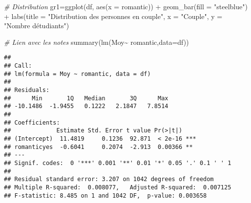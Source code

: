 \documentclass[
]{article}
\newenvironment{Shaded}{\begin{snugshade}}{\end{snugshade}}
\newcommand{\AttributeTok}[1]{\textcolor[rgb]{0.77,0.63,0.00}{#1}}
\newcommand{\CommentTok}[1]{\textcolor[rgb]{0.56,0.35,0.01}{\textit{#1}}}
\newcommand{\FunctionTok}[1]{\textcolor[rgb]{0.00,0.00,0.00}{#1}}
\newcommand{\NormalTok}[1]{#1}
\newcommand{\OtherTok}[1]{\textcolor[rgb]{0.56,0.35,0.01}{#1}}
\newcommand{\SpecialCharTok}[1]{\textcolor[rgb]{0.00,0.00,0.00}{#1}}
\newcommand{\StringTok}[1]{\textcolor[rgb]{0.31,0.60,0.02}{#1}}
\begin{document}
\begin{Shaded}
\begin{Highlighting}[]
\CommentTok{\# Distribution}
\NormalTok{gr1}\OtherTok{=}\FunctionTok{ggplot}\NormalTok{(df, }\FunctionTok{aes}\NormalTok{(}\AttributeTok{x =}\NormalTok{ romantic)) }\SpecialCharTok{+}
  \FunctionTok{geom\_bar}\NormalTok{(}\AttributeTok{fill =} \StringTok{"steelblue"}\NormalTok{) }\SpecialCharTok{+}
  \FunctionTok{labs}\NormalTok{(}\AttributeTok{title =} \StringTok{"Distribution des personnes en couple"}\NormalTok{,}
       \AttributeTok{x =} \StringTok{"Couple"}\NormalTok{, }\AttributeTok{y =} \StringTok{"Nombre d\textquotesingle{}étudiants"}\NormalTok{)}

\CommentTok{\# Lien avec les notes}
\FunctionTok{summary}\NormalTok{(}\FunctionTok{lm}\NormalTok{(Moy}\SpecialCharTok{\textasciitilde{}}\NormalTok{ romantic,}\AttributeTok{data=}\NormalTok{df))}
\end{Highlighting}
\end{Shaded}

\begin{verbatim}
## 
## Call:
## lm(formula = Moy ~ romantic, data = df)
## 
## Residuals:
##      Min       1Q   Median       3Q      Max 
## -10.1486  -1.9455   0.1222   2.1847   7.8514 
## 
## Coefficients:
##             Estimate Std. Error t value Pr(>|t|)    
## (Intercept)  11.4819     0.1236  92.871  < 2e-16 ***
## romanticyes  -0.6041     0.2074  -2.913  0.00366 ** 
## ---
## Signif. codes:  0 '***' 0.001 '**' 0.01 '*' 0.05 '.' 0.1 ' ' 1
## 
## Residual standard error: 3.207 on 1042 degrees of freedom
## Multiple R-squared:  0.008077,   Adjusted R-squared:  0.007125 
## F-statistic: 8.485 on 1 and 1042 DF,  p-value: 0.003658
\end{verbatim}
\end{document}
